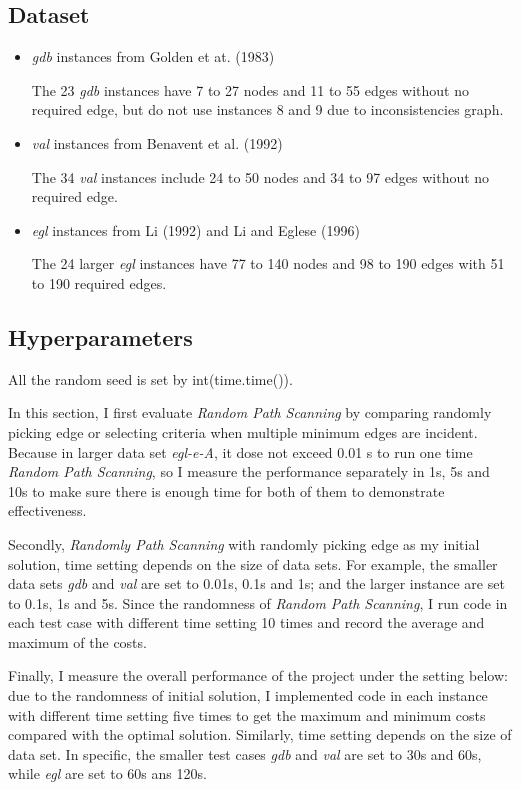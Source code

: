 \documentclass[conference,compsoc]{IEEEtran}
\begin{document}
\subsection{Dataset}
\begin{itemize}
	\item \textit{gdb} instances from Golden et at. (1983)
	\par The 23 \textit{gdb} instances have 7 to 27 nodes and 11 to 55 edges without no required edge, but do not use instances 8 and 9 due to inconsistencies graph.
	\item \textit{val} instances from Benavent et al. (1992)
	\par The 34 \textit{val} instances include 24 to 50 nodes and 34 to 97 edges without no required edge.
	\item \textit{egl} instances from Li (1992) and Li and Eglese (1996)
	\par The 24 larger \textit{egl} instances have 77 to 140 nodes and 98 to 190 edges with 51 to 190 required edges.
\end{itemize}

\subsection{Hyperparameters}
\par All the random seed is set by int(time.time()).
\par In this section, I first evaluate \textit{Random Path Scanning} by comparing randomly picking edge or selecting criteria when multiple minimum edges are incident. Because in larger data set \textit{egl-e-A},  it dose not exceed 0.01 s to run one time \textit{Random Path Scanning}, so I measure the performance separately in 1s, 5s and 10s to make sure there is enough time for both of them to demonstrate effectiveness. 
\par Secondly, \textit{Randomly Path Scanning} with randomly picking edge as my initial solution, time setting depends on the size of data sets. For example, the smaller data sets \textit{gdb} and \textit{val} are set to 0.01s, 0.1s and 1s; and the larger instance are set to 0.1s, 1s and 5s. Since the randomness of \textit{Random Path Scanning}, I run code in each test case with different time setting 10 times and record the average and maximum of the costs.
\par Finally, I measure the overall performance of the project under the setting below: due to the randomness of initial solution, I implemented code in each instance with different time setting five times to get the maximum and minimum costs compared with the optimal solution. Similarly, time setting depends on the size of data set. In specific, the smaller test cases \textit{gdb} and \textit{val} are set to 30s and 60s, while \textit{egl} are set to 60s ans 120s.
\end{document}
